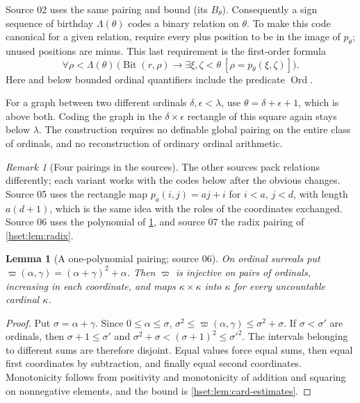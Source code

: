 \documentclass[11pt,letterpaper]{article}
\newtheorem{lemma}[lemma]{Lemma}\aliascntresetthe{lemma}
\theoremstyle{definition}
\theoremstyle{remark}
\newtheorem{remark}[remark]{Remark}\aliascntresetthe{remark}
\newcommand{\Ord}{\operatorname{Ord}}
\newcommand{\Bit}{\operatorname{Bit}}
\begin{document}
Source 02 uses the same pairing and bound (its $B_\theta$). Consequently a sign
sequence of birthday $\Lambda(\theta)$ codes a binary relation on $\theta$. To
make this code canonical for a given relation, require every plus position to
be in the image of $p_\theta$; unused positions are minus. This last
requirement is the first-order formula
\[
 \forall\rho<\Lambda(\theta)\,
 \bigl(\Bit(r,\rho)\longrightarrow
       \exists\xi,\zeta<\theta\ [\rho=p_\theta(\xi,\zeta)]\bigr).
\]
Here and below bounded ordinal quantifiers include the predicate $\Ord$.

For a graph between two different ordinals $\delta,\epsilon<\lambda$, use
$\theta=\delta+\epsilon+1$, which is above both. Coding the graph in the
$\delta\times\epsilon$ rectangle of this square again stays below $\lambda$.
The construction requires no definable global pairing on the entire class
of ordinals, and no reconstruction of ordinary ordinal arithmetic.

\begin{remark}[Four pairings in the sources]\label{hset:rem:pairings}
The other sources pack relations differently; each variant works with the codes
below after the obvious changes. Source 05 uses the rectangle map
$p_a(i,j)=aj+i$ for $i<a$, $j<d$, with length $a(d+1)$, which is the same idea
with the roles of the coordinates exchanged. Source 06 uses the polynomial of
\cref{hset:lem:pairing06}, and source 07 the radix pairing of
\cref{hset:lem:radix}.
\end{remark}

\begin{lemma}[A one-polynomial pairing; source 06]\label{hset:lem:pairing06}
On ordinal surreals put $\varpi(\alpha,\gamma)=(\alpha+\gamma)^2+\alpha$. Then
$\varpi$ is injective on pairs of ordinals, increasing in each coordinate, and
maps $\kappa\times\kappa$ into $\kappa$ for every uncountable cardinal
$\kappa$.
\end{lemma}
\begin{proof}
Put $\sigma=\alpha+\gamma$. Since $0\le\alpha\le\sigma$,
$\sigma^2\le\varpi(\alpha,\gamma)\le\sigma^2+\sigma$. If $\sigma<\sigma'$ are
ordinals, then $\sigma+1\le\sigma'$ and $\sigma^2+\sigma<(\sigma+1)^2\le
\sigma'^2$. The intervals belonging to different sums are therefore disjoint.
Equal values force equal sums, then equal first coordinates by subtraction,
and finally equal second coordinates. Monotonicity follows from positivity and
monotonicity of addition and squaring on nonnegative elements, and the bound
is \cref{hset:lem:card-estimates}.
\end{proof}
\end{document}

